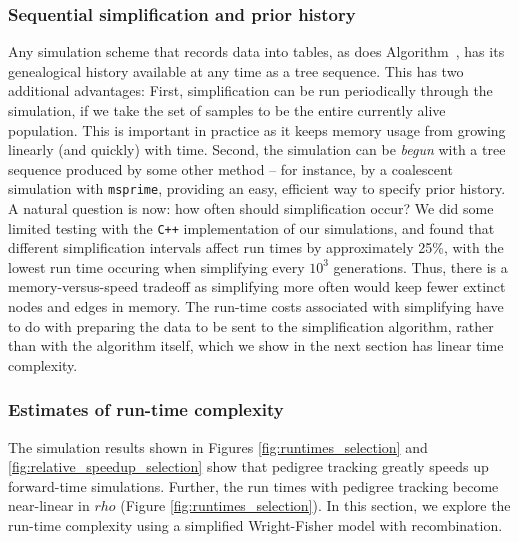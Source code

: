 \documentclass{article}
\newcommand{\cpp}{\texttt{C++}}
\newcommand{\msprime}{\texttt{msprime}}
\newcommand{\krt}[1]{{\em \color{green} #1}}
\begin{document}
\subsubsection*{Sequential simplification and prior history}
\label{ss:seq_simp}

Any simulation scheme that records data into tables,
as does Algorithm~,
has its genealogical history available at any time as a tree sequence.
This has two additional advantages:
First, simplification can be run periodically through the simulation,
if we take the set of samples to be the entire currently alive population.
This is important in practice as it keeps memory usage from growing linearly (and quickly) with time.
Second, the simulation can
be \emph{begun} with a tree sequence produced by some other method -- for
instance, by a coalescent simulation with \msprime,
providing an easy, efficient way to specify prior history.
A natural question is now: how often should simplification occur?  We did some limited testing with the \cpp{}
implementation of our simulations, and found that different simplification intervals affect run times by approximately
25\%, with the lowest run time occuring when simplifying every $10^3$ generations.  Thus, there is a memory-versus-speed
tradeoff as simplifying more often would keep fewer extinct nodes and edges in memory.  The run-time costs associated
with simplifying have to do with preparing the data to be sent to the simplification algorithm, rather than with the
algorithm itself, which we show in the next section has linear time complexity.

% 



\subsubsection*{Estimates of run-time complexity}

The simulation results shown in Figures \ref{fig:runtimes_selection} and \ref{fig:relative_speedup_selection} show that
pedigree tracking greatly speeds up forward-time simulations.  Further, the run times with pedigree tracking become
near-linear in $rho$ (Figure \ref{fig:runtimes_selection}).  In this section, we explore the run-time complexity using a
simplified Wright-Fisher model with recombination.
\end{document}
